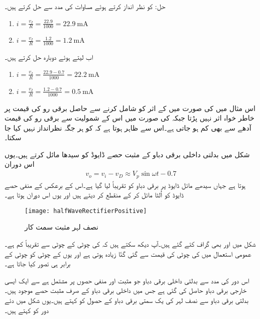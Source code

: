 حل:	 کو نظر انداز کرتے ہوئے مساوات   کی مدد سے حل کرتے ہیں۔
\begin{enumerate}
\item
$i=\frac{v_I}{R}=\frac{22.9}{1000}=\SI{22.9}{\milli \ampere}$
\item
$i=\frac{v_I}{R}=\frac{1.2}{1000}=\SI{1.2}{\milli \ampere}$
\end{enumerate}
اب  لیتے ہوئے دوبارہ حل کرتے ہیں۔
\begin{enumerate}
\item
$i=\frac{v_I}{R}=\frac{22.9-0.7}{1000}=\SI{22.2}{\milli \ampere}$
\item
$i=\frac{v_I}{R}=\frac{1.2-0.7}{1000}=\SI{0.5}{\milli \ampere}$
\end{enumerate}


اس مثال میں  کی صورت میں  کے اثر کو شامل کرنے سے حاصل برقی رو   کی قیمت پر خاطر خواہ اثر نہیں پڑتا جبکہ کی صورت میں اس کے شمولیت سے برقی رو کی قیمت آدھے سے بھی کم ہو جاتی ہے۔اس سے ظاہر ہوتا ہے کہ  کو ہر جگہ نظرانداز نہیں کیا جا سکتا۔

 
	شکل   میں بدلتی داخلی برقی دباو   کے مثبت حصے ڈایوڈ  کو سیدھا مائل کرتے ہیں۔یوں اس دوران
\begin{align*}
v_o = v_i  - v_D \approx V_p \sin \omega t  - 0.7
\end{align*}
ہوتا ہے جہاں سیدھے مائل ڈایوڈ پر برقی دباو کو تقریباً  لیا گیا ہے۔اس کے برعکس   کے منفی حصے ڈایوڈ کو اُلٹا مائل کر کے منقطع کر دیتے ہیں اور یوں اس دوران   ہوتا ہے۔
\begin{figure}
\centering
\texttt{[image: halfWaveRectifierPositive]}
\caption{نصف لہر مثبت سمت کار}
\label{شکل_نصف_لہر_مثبت_سمت_کار}
\end{figure}
شکل  میں   اور  بھی گراف کئے گئے ہیں۔آپ دیکھ سکتے ہیں کہ   کی چوٹی  کے چوٹی سے تقریباً  کم ہے۔عمومی استعمال میں  کی چوٹی کی قیمت  سے گئی گنّا زیادہ ہوتی ہے اور یوں  کے چوٹی کو  چوٹی کے برابر ہی تصور کیا جاتا ہے۔

اس دور کی مدد سے بدلتی داخلی برقی دباو جو مثبت اور منفی حصوں پر مشتمل ہے سے ایک ایسی خارجی برقی دباو حاصل کی گئی ہے جس میں داخلی برقی دباو کے صرف مثبت حصے موجود ہیں۔ بدلتی برقی دباو سے نصف لہر کی یک سمتی برقی دباو کے حصول کو   کہتے ہیں۔یوں شکل  میں دئے دور کو   کہتے ہیں۔

